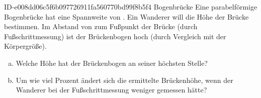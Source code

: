 \begin{exercise}
      {ID-e008dd06c5f6b097726911fa560770bd99f8b5f4}
      {Bogenbrücke}
  \ifproblem\problem
    Eine parabelförmige Bogenbrücke hat eine Spannweite von .
    Ein Wanderer will die Höhe der Brücke bestimmen. Im Abstand von
     zum Fußpunkt der Brücke (durch Fußschrittmessung) ist der
    Brückenbogen  hoch (durch Vergleich mit der Körpergröße).
    \begin{enumerate}[a)]
      \item Welche Höhe hat der Brückenbogen an seiner höchsten Stelle?
      \item Um wie viel Prozent ändert sich die ermittelte Brückenhöhe, wenn
            der Wanderer bei der Fußschrittmessung  weniger gemessen
            hätte?
    \end{enumerate}
  \fi
\end{exercise}

